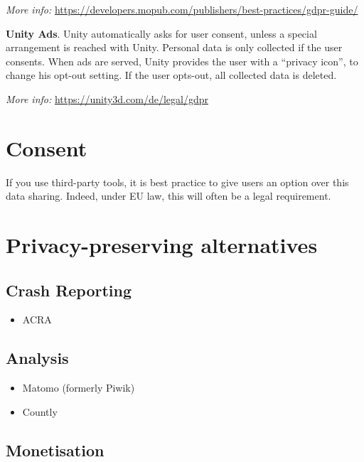 \documentclass[
]{book}
\providecommand{\tightlist}{%
  \setlength{\itemsep}{0pt}\setlength{\parskip}{0pt}}
\begin{document}
\emph{More info:} \url{https://developers.mopub.com/publishers/best-practices/gdpr-guide/}

\textbf{Unity Ads}. Unity automatically asks for user consent, unless a special arrangement is reached with Unity. Personal data is only collected if the user consents. When ads are served, Unity provides the user with a ``privacy icon'', to change his opt-out setting. If the user opts-out, all collected data is deleted.

\emph{More info:} \url{https://unity3d.com/de/legal/gdpr}

\hypertarget{consent}{%
\section{Consent}\label{consent}}

If you use third-party tools, it is best practice to give users an option over this data sharing. Indeed, under EU law, this will often be a legal requirement.

\hypertarget{privacy-preserving-alternatives}{%
\section{Privacy-preserving alternatives}\label{privacy-preserving-alternatives}}

\hypertarget{crash-reporting}{%
\subsection{Crash Reporting}\label{crash-reporting}}

\begin{itemize}
\tightlist
\item
  ACRA
\end{itemize}

\hypertarget{analysis}{%
\subsection{Analysis}\label{analysis}}

\begin{itemize}
\tightlist
\item
  Matomo (formerly Piwik)
\item
  Countly
\end{itemize}

\hypertarget{monetisation}{%
\subsection{Monetisation}\label{monetisation}}
\end{document}
